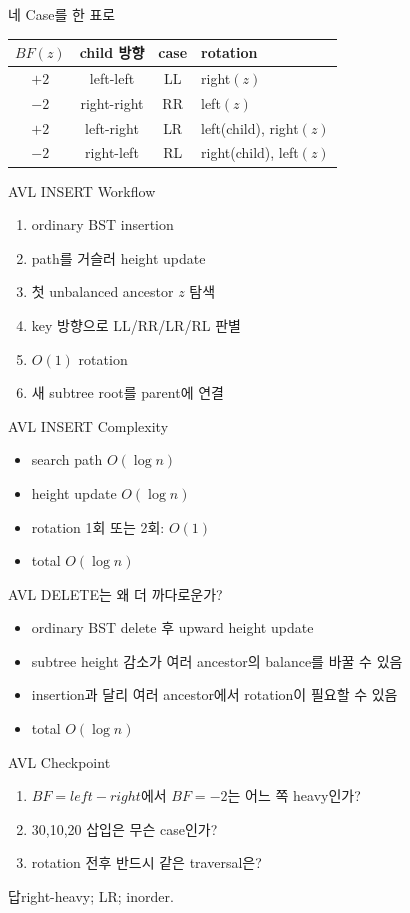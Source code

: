 \begin{frame}{네 Case를 한 표로}
\centering\begin{tabular}{cccl}\toprule
$BF(z)$&child 방향&case&rotation\\\midrule
$+2$&left-left&LL&right$(z)$\\
$-2$&right-right&RR&left$(z)$\\
$+2$&left-right&LR&left(child), right$(z)$\\
$-2$&right-left&RL&right(child), left$(z)$\\\bottomrule
\end{tabular}
\end{frame}
\begin{frame}{AVL INSERT Workflow}
\begin{enumerate}\item ordinary BST insertion\item path를 거슬러 height update\item 첫 unbalanced ancestor $z$ 탐색\item key 방향으로 LL/RR/LR/RL 판별\item $O(1)$ rotation\item 새 subtree root를 parent에 연결\end{enumerate}
\end{frame}
\begin{frame}{AVL INSERT Complexity}
\begin{itemize}
\item search path $O(\log n)$
\item height update $O(\log n)$
\item rotation 1회 또는 2회: $O(1)$
\item total $O(\log n)$
\end{itemize}
\end{frame}
\begin{frame}{AVL DELETE는 왜 더 까다로운가?}
\begin{itemize}\item ordinary BST delete 후 upward height update\item subtree height 감소가 여러 ancestor의 balance를 바꿀 수 있음\item insertion과 달리 여러 ancestor에서 rotation이 필요할 수 있음\item total $O(\log n)$\end{itemize}
\end{frame}
\begin{frame}{AVL Checkpoint}
\begin{enumerate}\item $BF=left-right$에서 $BF=-2$는 어느 쪽 heavy인가?\item 30,10,20 삽입은 무슨 case인가?\item rotation 전후 반드시 같은 traversal은?\end{enumerate}
\begin{exampleblock}{답}right-heavy; LR; inorder.\end{exampleblock}
\end{frame}
